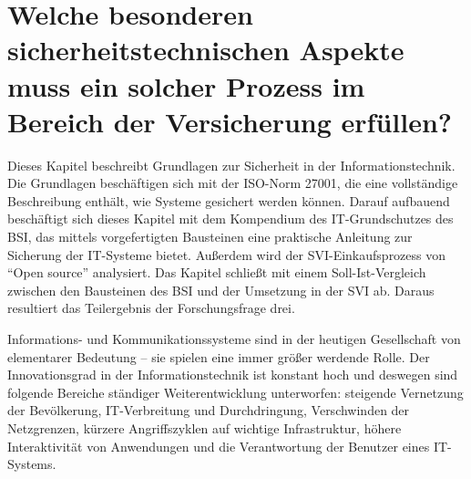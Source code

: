 \chapter[Forschungsfrage 3]{Welche besonderen sicherheitstechnischen Aspekte muss ein solcher Prozess im Bereich der Versicherung erfüllen?} \label{ff3}
Dieses Kapitel beschreibt Grundlagen zur Sicherheit in der Informationstechnik. Die Grundlagen beschäftigen sich mit der ISO-Norm 27001, die eine vollständige Beschreibung enthält, wie Systeme gesichert werden können. Darauf aufbauend beschäftigt sich dieses Kapitel mit dem Kompendium des IT-Grundschutzes des \ac{BSI}, das mittels vorgefertigten Bausteinen eine praktische Anleitung zur Sicherung der IT-Systeme bietet. Außerdem wird der \ac{SVI}-Einkaufsprozess von \enquote{Open source} analysiert. Das Kapitel schließt mit einem Soll-Ist-Vergleich zwischen den Bausteinen des \ac{BSI} und der Umsetzung in der \ac{SVI} ab. Daraus resultiert das Teilergebnis der Forschungsfrage drei.
\par
Informations- und Kommunikationssysteme sind in der heutigen Gesellschaft von elementarer Bedeutung -- sie spielen eine immer größer werdende Rolle. Der Innovationsgrad in der Informationstechnik ist konstant hoch und deswegen sind folgende Bereiche ständiger Weiterentwicklung unterworfen: steigende Vernetzung der Bevölkerung, IT-Verbreitung und Durchdringung, Verschwinden der Netzgrenzen, kürzere Angriffszyklen auf wichtige Infrastruktur, höhere Interaktivität von Anwendungen und die Verantwortung der Benutzer eines IT-Systems.\autocite[vgl.][S.\,2f.]{bundesamt_fur_sicherheit_in_der_informationstechnik_bsi_it-grundschutz-kompendium_2020}

